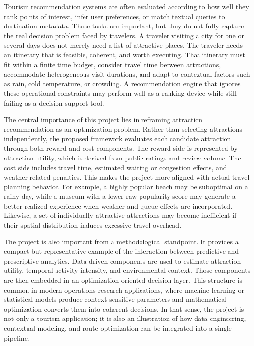 \documentclass[12pt,a4paper]{article}
\begin{document}
Tourism recommendation systems are often evaluated according to how well they rank points of interest, infer user preferences, or match textual queries to destination metadata. Those tasks are important, but they do not fully capture the real decision problem faced by travelers. A traveler visiting a city for one or several days does not merely need a list of attractive places. The traveler needs an itinerary that is feasible, coherent, and worth executing. That itinerary must fit within a finite time budget, consider travel time between attractions, accommodate heterogeneous visit durations, and adapt to contextual factors such as rain, cold temperature, or crowding. A recommendation engine that ignores these operational constraints may perform well as a ranking device while still failing as a decision-support tool.

The central importance of this project lies in reframing attraction recommendation as an optimization problem. Rather than selecting attractions independently, the proposed framework evaluates each candidate attraction through both reward and cost components. The reward side is represented by attraction utility, which is derived from public ratings and review volume. The cost side includes travel time, estimated waiting or congestion effects, and weather-related penalties. This makes the project more aligned with actual travel planning behavior. For example, a highly popular beach may be suboptimal on a rainy day, while a museum with a lower raw popularity score may generate a better realized experience when weather and queue effects are incorporated. Likewise, a set of individually attractive attractions may become inefficient if their spatial distribution induces excessive travel overhead.

The project is also important from a methodological standpoint. It provides a compact but representative example of the interaction between predictive and prescriptive analytics. Data-driven components are used to estimate attraction utility, temporal activity intensity, and environmental context. Those components are then embedded in an optimization-oriented decision layer. This structure is common in modern operations research applications, where machine-learning or statistical models produce context-sensitive parameters and mathematical optimization converts them into coherent decisions. In that sense, the project is not only a tourism application; it is also an illustration of how data engineering, contextual modeling, and route optimization can be integrated into a single pipeline.
\end{document}
